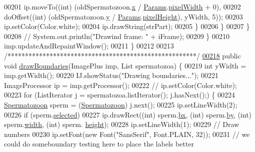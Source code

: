 \begin{DoxyCode}
00201             ip.moveTo((\textcolor{keywordtype}{int}) (oldSpermatozoon.\hyperlink{classdata_1_1_spermatozoon_ad0da36b2558901e21e7a30f6c227a45e}{x} / \hyperlink{classdata_1_1_params}{Params}.\hyperlink{classdata_1_1_params_a6bc7d1b46eaf3b2ebdc0bab5d9634c79}{pixelWidth} + 0),
00202                 doOffset((\textcolor{keywordtype}{int}) (oldSpermatozoon.\hyperlink{classdata_1_1_spermatozoon_aa4f0d3eebc3c443f9be81bf48561a217}{y} / \hyperlink{classdata_1_1_params}{Params}.\hyperlink{classdata_1_1_params_a193425ff40a106f84f7980effb603136}{pixelHeight}), yWidth, 5));
00203             ip.setColor(Color.white);
00204             ip.drawString(strPart);
00205           \}
00206         \}
00207       \}
00208 \textcolor{comment}{//      System.out.println("Drawind frame: " + iFrame);}
00209     \}
00210     imp.updateAndRepaintWindow();
00211   \}
00212 
00213   \textcolor{comment}{/******************************************************/}
\hypertarget{_paint_8java_source_l00218}{}\hyperlink{classfunctions_1_1_paint_af5c5db6d9fe79eafc658aeb3e0d17b1f}{00218}   \textcolor{keyword}{public} \textcolor{keywordtype}{void} \hyperlink{classfunctions_1_1_paint_af5c5db6d9fe79eafc658aeb3e0d17b1f}{drawBoundaries}(ImagePlus imp, List spermatozoa) \{
00219     \textcolor{keywordtype}{int} yWidth = imp.getWidth();
00220     IJ.showStatus(\textcolor{stringliteral}{"Drawing boundaries..."});
00221     ImageProcessor ip = imp.getProcessor();
00222 \textcolor{comment}{//    ip.setColor(Color.white);}
00223     \textcolor{keywordflow}{for} (ListIterator j = spermatozoa.listIterator(); j.hasNext();) \{
00224       \hyperlink{classdata_1_1_spermatozoon}{Spermatozoon} sperm = (\hyperlink{classdata_1_1_spermatozoon}{Spermatozoon}) j.next();
00225       ip.setLineWidth(2);
00226       \textcolor{keywordflow}{if} (sperm.\hyperlink{classdata_1_1_spermatozoon_a6c5a33868fa92607c84982d696b8e957}{selected})
00227         ip.drawRect((\textcolor{keywordtype}{int}) sperm.\hyperlink{classdata_1_1_spermatozoon_a5c25ae7634a79d11d6679b6b07c240a1}{bx}, (\textcolor{keywordtype}{int}) sperm.\hyperlink{classdata_1_1_spermatozoon_affce45e955f0a114a5569e019b8d8634}{by}, (\textcolor{keywordtype}{int}) sperm.\hyperlink{classdata_1_1_spermatozoon_ae426f00e82704fa09578f5446e22d915}{width}, (\textcolor{keywordtype}{int}) sperm.
      \hyperlink{classdata_1_1_spermatozoon_a48083b65ac9a863566dc3e3fff09a5b4}{height});
00228       ip.setLineWidth(1);
00229       \textcolor{comment}{// Draw numbers}
00230       ip.setFont(\textcolor{keyword}{new} Font(\textcolor{stringliteral}{"SansSerif"}, Font.PLAIN, 32));
00231       \textcolor{comment}{// we could do someboundary testing here to place the labels better}

\end{DoxyCode}
